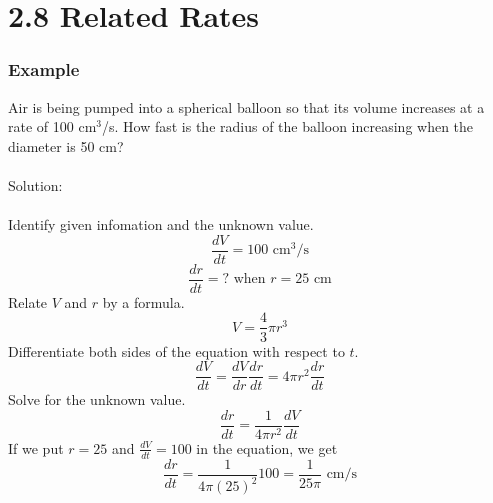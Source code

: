 %
%

\section*{2.8 Related Rates}

\subsubsection*{Example}

Air is being pumped into a spherical balloon so that its volume increases at a rate of 100 cm\(^3\)/s. How fast is the radius of the balloon increasing when the diameter is 50 cm?
\\\\
Solution:
\\\\
Identify given infomation and the unknown value.
$$ \frac{dV}{dt} = 100 \text{ cm}^3/\text{s} $$
$$ \frac{dr}{dt} =\text{? when } r = 25 \text{ cm} $$
Relate \(V\) and \(r\) by a formula.
$$ V=\frac{4}{3} \pi r^3 $$
Differentiate both sides of the equation with respect to \(t\).
$$ \frac{dV}{dt}=\frac{dV}{dr}\frac{dr}{dt}=4 \pi r^2 \frac{dr}{dt} $$
Solve for the unknown value.
$$ \frac{dr}{dt} = \frac{1}{4 \pi r^2} \frac{dV}{dt} $$
If we put \(r=25\) and \(\frac{dV}{dt}=100\) in the equation, we get
$$ \frac{dr}{dt} = \frac{1}{4 \pi (25)^2}100=\frac{1}{25 \pi} \text{ cm/s} $$ 
